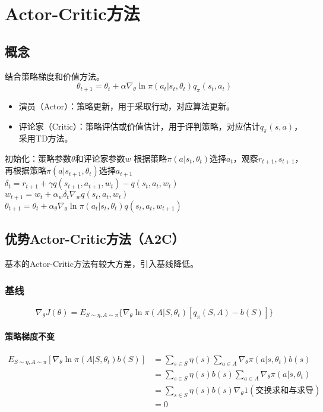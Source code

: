 \documentclass[
12pt, %
a4paper, 
oneside, %
headinclude,footinclude, %
]{scrartcl}
\begin{document}
\section{Actor-Critic方法}
\subsection[概念]{概念}
结合策略梯度和价值方法。
$$ \theta_{t + 1} = \theta_t + \alpha \nabla_\theta \ln \pi(a_t|s_t, \theta_t) q_\pi(s_t, a_t) $$
\begin{itemize}
\item 演员（Actor）：策略更新，用于采取行动，对应算法更新。
\item 评论家（Critic）：策略评估或价值估计，用于评判策略，对应估计$ q_{\pi}(s, a) $，采用TD方法。
\end{itemize}
\begin{myalgorithm}[QAC]
\State 初始化：策略参数$ \theta $和评论家参数$ w $
\State 根据策略$ \pi(a|s_t, \theta_t) $选择$ a_t $，观察$ r_{t + 1}, s_{t + 1} $，再根据策略$ \pi(a|s_{t + 1}, \theta_t) $选择$ a_{t + 1} $
\State $ \delta_t = r_{t + 1} + \gamma q(s_{t + 1}, a_{t + 1}, w_t) - q(s_t, a_t, w_t) $ 
\State $ w_{t + 1} = w_t + \alpha_w \delta_t \nabla_w q(s_t, a_t, w_t) $ 
\State $ \theta_{t + 1} = \theta_t + \alpha_\theta \nabla_\theta \ln \pi(a_t|s_t, \theta_t) q(s_t, a_t, w_{t + 1}) $ 
\EndFor
\EndFor
\end{myalgorithm}
\subsection[优势Actor-Critic方法]{优势Actor-Critic方法（A2C）}
基本的Actor-Critic方法有较大方差，引入基线降低。
\subsubsection[基线]{基线}
$$ \nabla_\theta J(\theta) = E_{S \sim \eta, A \sim \pi}\{\nabla_\theta \ln \pi(A|S, \theta_t) [q_\pi(S, A) - b(S)]\} $$
\paragraph{策略梯度不变}
\begin{align*}
E_{S\sim\eta,A\sim\pi}[\nabla_\theta\ln\pi(A|S,\theta_t)b(S)] &= \sum_{s\in S}\eta(s)\sum_{a\in A}\nabla_\theta\pi(a|s,\theta_t)b(s) \\
&= \sum_{s\in S}\eta(s)b(s)\sum_{a\in A}\nabla_\theta\pi(a|s,\theta_t) \\
&= \sum_{s\in S}\eta(s)b(s)\nabla_\theta 1 (\text{交换求和与求导}) \\
&= 0
\end{align*}
\end{document}
